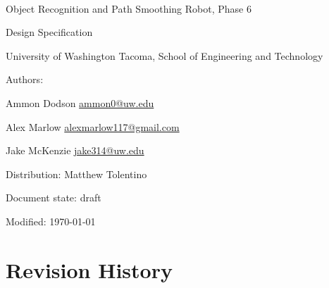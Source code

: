 \documentclass[english,12pt]{article}
\begin{document}
\begin{center}

\thispagestyle{empty}

$ $

\vspace{250pt}

\begin{bfseries}

{\Large Object Recognition and Path Smoothing Robot, Phase 6}

{\Huge Design Specification}


\end{bfseries}

\vspace{180pt}

University of Washington Tacoma, School of Engineering and Technology


\vspace{12pt}

Authors: 

Ammon Dodson \href{mailto:ammon0@uw.edu}{ammon0@uw.edu} 

Alex Marlow \href{mailto:alexmarlow117@gmail.com}{alexmarlow117@gmail.com} 

Jake McKenzie \href{mailto:jake314@uw.edu}{jake314@uw.edu}

Distribution: Matthew Tolentino

Document state: draft

Modified: \today

\end{center}

\newpage


\tableofcontents

\newpage


\section{Revision History}
\end{document}
